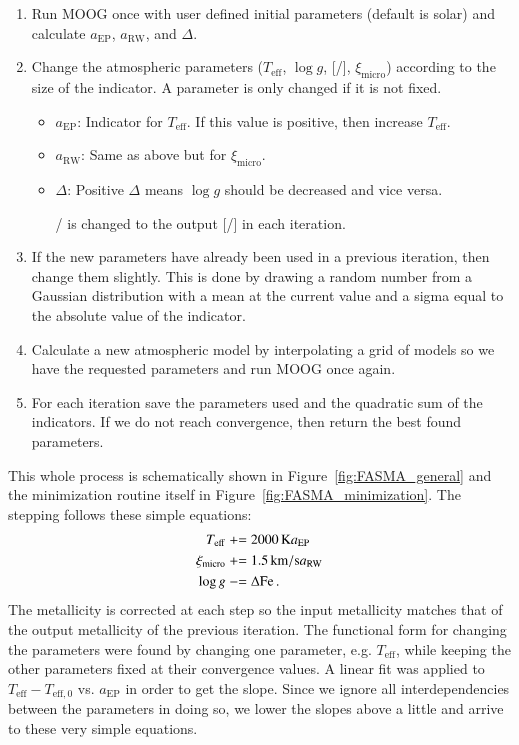 \documentclass{aa}
\newcommand{\pluseq}{\mathrel{+}=}
\newcommand{\minuseq}{\mathrel{-}=}
\begin{document}
\begin{enumerate}
    \item Run MOOG once with user defined initial parameters (default is
          solar) and calculate $a_\mathrm{EP}$, $a_\mathrm{RW}$, and
          $\Delta$.
    \item Change the atmospheric parameters ($T_\mathrm{eff}$, $\log g$,
          [/], $\xi_\mathrm{micro}$) according to the size of the
          indicator. A parameter is only changed if it is not fixed.
    \begin{itemize}
        \item $a_\mathrm{EP}$: Indicator for $T_\mathrm{eff}$. If this value
              is positive, then increase $T_\mathrm{eff}$.
        \item $a_\mathrm{RW}$: Same as above but for $\xi_\mathrm{micro}$.
        \item $\Delta$: Positive $\Delta$ means $\log g$
              should be decreased and vice versa.
        \item [\ion{Fe}{}/\ion{H}{}] is changed to the output
              [/] in each iteration.
    \end{itemize}
    \item If the new parameters have already been used in a previous iteration,
          then change them slightly. This is done by drawing a random number
          from a Gaussian distribution with a mean at the current value and a
          sigma equal to the absolute value of the indicator.
    \item Calculate a new atmospheric model by interpolating a grid of models
          so we have the requested parameters and run MOOG once again.
    \item For each iteration save the parameters used and the quadratic sum of
          the indicators. If we do not reach convergence, then return the best
          found parameters.
\end{enumerate}
This whole process is schematically shown in Figure~\ref{fig:FASMA_general} and
the minimization routine itself in Figure~\ref{fig:FASMA_minimization}. The
stepping follows these simple equations:
\begin{align}
    T_\mathrm{eff}     &\pluseq \SI{2000}{K} a_\mathrm{EP}   \\
    \xi_\mathrm{micro} &\pluseq \SI{1.5}{km/s} a_\mathrm{RW} \\
    \log g             &\minuseq \Delta\ion{Fe}.
\end{align}
The metallicity is corrected at each step so the input metallicity matches that
of the output metallicity of the previous iteration. The functional form for
changing the parameters were found by changing one parameter, e.g.
$T_\mathrm{eff}$, while keeping the other parameters fixed at their convergence
values. A linear fit was applied to $T_\mathrm{eff} - T_\mathrm{eff,0}$ vs.
$a_\mathrm{EP}$ in order to get the slope. Since we ignore all interdependencies
between the parameters in doing so, we lower the slopes above a little and
arrive to these very simple equations.
\end{document}
